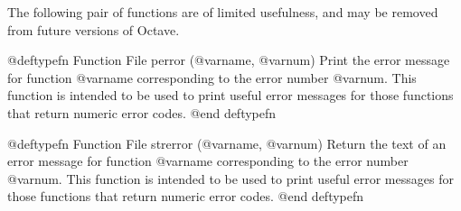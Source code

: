 The following pair of functions are of limited usefulness, and may be
removed from future versions of Octave.

@deftypefn {Function File} {} perror (@var{name}, @var{num})
Print the error message for function @var{name} corresponding to the
error number @var{num}.  This function is intended to be used to print
useful error messages for those functions that return numeric error
codes.
@end deftypefn

@deftypefn {Function File} {} strerror (@var{name}, @var{num})
Return the text of an error message for function @var{name}
corresponding to the error number @var{num}.  This function is intended
to be used to print useful error messages for those functions that
return numeric error codes.
@end deftypefn
